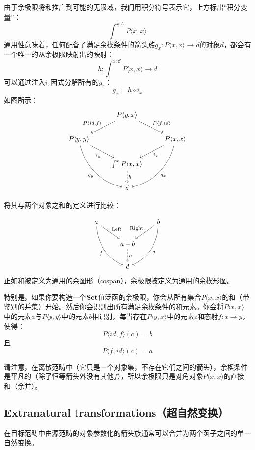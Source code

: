 \documentclass[DaoFP]{subfiles}
\begin{document}
 由于余极限将和推广到可能的无限域，我们用积分符号表示它，上方标出“积分变量”：
 \[ \int^{x\colon \mathcal{C}} P \langle x, x \rangle \]
 通用性意味着，任何配备了满足余楔条件的箭头族$g_x \colon P \langle x, x \rangle \to d$的对象$d$，都会有一个唯一的从余极限映射出的映射：
 \[ h \colon \int^{x\colon \mathcal{C}} P \langle x, x \rangle \to d \]
 可以通过注入$i_x$因式分解所有的$g_x$：
 \[ g_x = h \circ i_x \]
 如图所示：
 \[
  \begin{tikzcd}
   &P \langle y, x \rangle
   \arrow[ld, "{P \langle id, f \rangle}"']
   \arrow[rd, "{P \langle f, id \rangle}"]
   \\
   P \langle y, y \rangle
   \arrow[dr, "i_y"']
   \arrow[ddr, bend right,  "g_y"']
   &&P \langle x, x \rangle
   \arrow[dl, "i_x"]
   \arrow[ddl, bend left,  "g_x"]
   \\
   &\int^x P \langle x, x \rangle
   \arrow[d, dashed, "h"]
   \\
   &d
  \end{tikzcd}
 \]

 将其与两个对象之和的定义进行比较：

 \[
  \begin{tikzcd}
   a
   \arrow[dr, "\text{Left}"]
   \arrow[ddr, bend right, "f"']
   && b
   \arrow[dl, "\text{Right}"']
   \arrow[ddl, bend left, "g"]
   \\
   &a + b
   \arrow[d, dashed, "h"]
   \\
   & d
  \end{tikzcd}
 \]
 正如和被定义为通用的余图形（cospan），余极限被定义为通用的余楔形图。

 特别是，如果你要构造一个$\mathbf{Set}$值泛函的余极限，你会从所有集合$P \langle x, x \rangle$的和（带鉴别的并集）开始。然后你会识别出所有满足余楔条件的和元素。你会将$P \langle x, x \rangle$中的元素$a$与$P \langle y, y \rangle$中的元素$b$相识别，每当存在$P \langle y, x \rangle$中的元素$c$和态射$f \colon x \to y$，使得：
 \[ P \langle id, f \rangle (c) = b\]
 且
 \[ P \langle f, id \rangle (c) = a\]

 请注意，在离散范畴中（它只是一个对象集，不存在它们之间的箭头），余楔条件是平凡的（除了恒等箭头外没有其他$f$），所以余极限只是对角对象$P \langle x, x \rangle$的直接和（余并）。

 \subsection{Extranatural transformations（超自然变换）}

 在目标范畴中由源范畴的对象参数化的箭头族通常可以合并为两个函子之间的单一自然变换。
\end{document}
